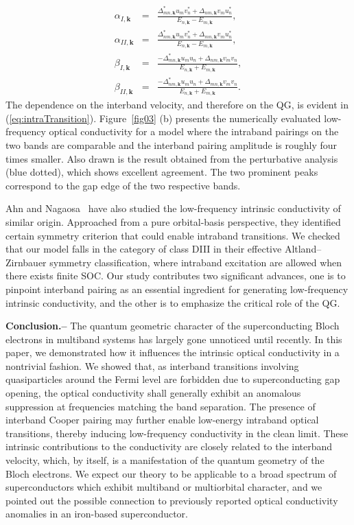 \documentclass[prl,floatfix,twocolumn,showpacs,amsmath,superscriptaddress]{revtex4-2}
\renewcommand{\vec}[1]{\mathbf{#1}}
\newcommand{\vk}{{\vec{k}}}
\begin{document}
\begin{eqnarray}
	\alpha_{I,\vk}&=&\frac{\Delta_{mn,\vk}^*u_mv_n^*+\Delta_{nm,\vk}v_mu_n^*}{E_{n,\vk}-E_{m,\vk}}, \nonumber \\
	\alpha_{II,\vk}&=&\frac{\Delta_{nm,\vk}^*u_mv_n^*+\Delta_{mn,\vk}v_mu_n^*}{E_{n,\vk}-E_{m,\vk}}, \nonumber \\
	\beta_{I,\vk}&=&\frac{-\Delta_{mn,\vk}^*u_mu_n+\Delta_{nm,\vk}v_mv_n}{E_{n,\vk}+E_{m,\vk}}, \nonumber \\
	\beta_{II,\vk}&=&\frac{ -\Delta_{nm,\vk}^*u_mu_n+\Delta_{mn,\vk}v_mv_n}{E_{n,\vk}+E_{m,\vk}}. 
\end{eqnarray}
The dependence on the interband velocity, and therefore on the QG, is evident in (\ref{eq:intraTransition}). Figure~\ref{fig03} (b) presents the numerically evaluated low-frequency optical conductivity for a model where the intraband pairings on the two bands are comparable and the interband pairing amplitude is roughly four times smaller. Also drawn is the result obtained from the perturbative analysis (blue dotted), which shows excellent agreement. The two prominent peaks correspond to the gap edge of the two respective bands. 

Ahn and Nagaosa~\cite{Nagaosa:21} have also studied the low-frequency intrinsic conductivity of similar origin. Approached from a pure orbital-basis perspective, they identified certain symmetry criterion that could enable intraband transitions. We checked that our model falls in the category of class DIII in their effective Altland–Zirnbauer symmetry classification, where intraband excitation are allowed when there exists finite SOC. Our study contributes two significant advances, one is to pinpoint interband pairing as an essential ingredient for generating low-frequency intrinsic conductivity, and the other is to emphasize the critical role of the QG. 

{\bf Conclusion.--} The quantum geometric character of the superconducting Bloch electrons in multiband systems has largely gone unnoticed until recently. In this paper, we demonstrated how it influences the intrinsic optical conductivity in a nontrivial fashion. We showed that, as interband transitions involving quasiparticles around the Fermi level are forbidden due to superconducting gap opening, the optical conductivity shall generally exhibit an anomalous suppression at frequencies matching the band separation. The presence of interband Cooper pairing may further enable low-energy intraband optical transitions, thereby inducing low-frequency conductivity in the clean limit. These intrinsic contributions to the conductivity are closely related to the interband velocity, which, by itself, is a manifestation of the quantum geometry of the Bloch electrons. We expect our theory to be applicable to a broad spectrum of superconductors which exhibit multiband or multiorbital character, and we pointed out the possible connection to previously reported optical conductivity anomalies in an iron-based superconductor. 
\end{document}
